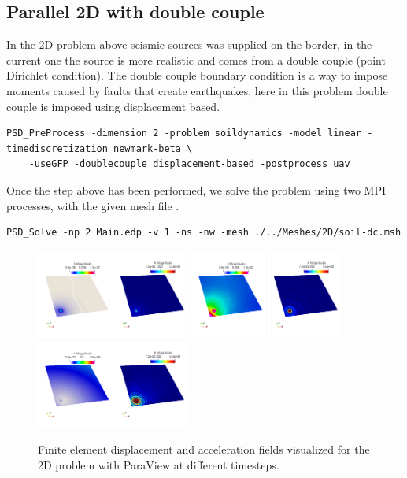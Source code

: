 \subsection{Parallel 2D with double couple}

In the 2D problem above seismic sources was supplied on the border, in the current one the source is more realistic and comes from a double couple (point Dirichlet condition). The double couple boundary condition is a way to impose moments caused by faults that create earthquakes, here in this problem double couple is imposed using displacement based. 

\begin{lstlisting}[style=BashInputStyle]
	PSD_PreProcess -dimension 2 -problem soildynamics -model linear -timediscretization newmark-beta \
	-useGFP -doublecouple displacement-based -postprocess uav
\end{lstlisting}

Once the step above has been performed, we solve the problem using two MPI processes, with the given mesh file . 

\begin{lstlisting}[style=BashInputStyle]
	PSD_Solve -np 2 Main.edp -v 1 -ns -nw -mesh ./../Meshes/2D/soil-dc.msh
\end{lstlisting}

\begin{figure}[h!]
	\centering
	\includegraphics[width=0.45\textwidth]{./Images/sd-2ddcu0.png}
	\includegraphics[width=0.45\textwidth]{./Images/sd-2ddcu1.png}\\
	\includegraphics[width=0.45\textwidth]{./Images/sd-2ddcu2.png}
	\caption{Finite element displacement and acceleration fields visualized for the 2D problem with ParaView at different timesteps. \label{bar2ddc-sd}}
\end{figure}

